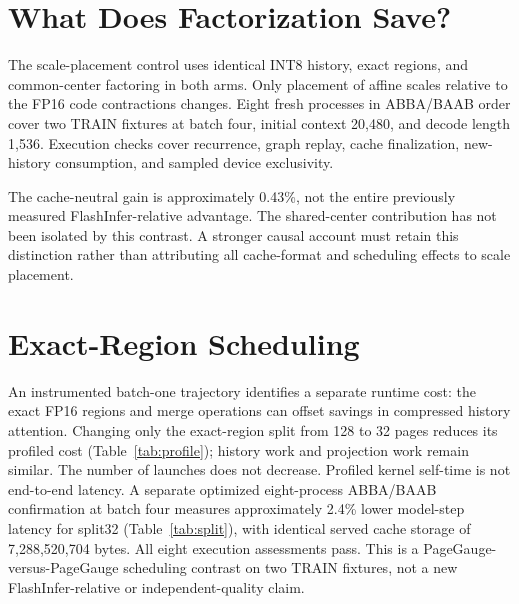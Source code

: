 \documentclass{article}
\begin{document}
\section{What Does Factorization Save?}
The scale-placement control uses identical INT8 history, exact regions, and
common-center factoring in both arms. Only placement of affine scales relative
to the FP16 code contractions changes. Eight fresh processes in ABBA/BAAB order
cover two TRAIN fixtures at batch four, initial context 20,480, and decode
length 1,536. Execution checks cover recurrence, graph replay, cache finalization,
new-history consumption, and sampled device exclusivity.

\begin{table}[t]
\caption{Scale-placement control: register-control latency divided by
factorized latency. Hierarchical intervals resample fixture then adjacent pair;
only two fixture clusters limit generality.}
\label{tab:causal}\centering\small

\end{table}

The cache-neutral gain is approximately 0.43\%, not the entire previously
measured FlashInfer-relative advantage. The shared-center contribution has not
been isolated by this contrast. A stronger causal account must retain this
distinction rather than attributing all cache-format and scheduling effects to
scale placement.

\section{Exact-Region Scheduling}
An instrumented batch-one trajectory identifies a separate runtime cost:
the exact FP16 regions and merge operations can offset savings in compressed
history attention. Changing only the exact-region split from 128 to 32 pages
reduces its profiled cost (Table~\ref{tab:profile}); history work and projection
work remain similar. The number of launches does not decrease. Profiled kernel
self-time is not end-to-end latency. A separate optimized eight-process
ABBA/BAAB confirmation at batch four measures approximately 2.4\% lower model-step
latency for split32 (Table~\ref{tab:split}), with identical served cache storage
of 7,288,520,704 bytes. All eight execution assessments pass. This is a
PageGauge-versus-PageGauge scheduling contrast on two TRAIN fixtures, not a new
FlashInfer-relative or independent-quality claim.

\begin{table}[t]
\caption{Optimized exact-region scheduling: split128 latency divided by
split32 latency at B4/C20480/D1536. Eight fresh processes, four adjacent pairs,
two fixture clusters; hierarchical 95\% intervals.}
\label{tab:split}\centering\small

\end{table}
\end{document}
